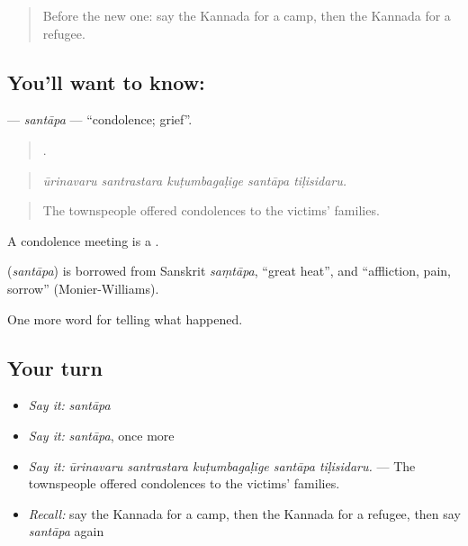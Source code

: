 \label{lesson:KA-C375-santapa}



\begin{quote}
Before the new one: say the Kannada for a camp, then the Kannada for a refugee.
\end{quote}

\subsection*{You'll want to know: }
\textbf{} — \emph{santāpa} — \textquotedblleft{}condolence; grief\textquotedblright{}.

\begin{quote}
    .
\end{quote}

\begin{quote}
\emph{ūrinavaru santrastara kuṭumbagaḷige santāpa tiḷisidaru.}
\end{quote}

\begin{quote}
The townspeople offered condolences to the victims' families.
\end{quote}

A condolence meeting is a  .

\begin{cousinweb}
\textbf{} (\emph{santāpa}) is borrowed from Sanskrit \emph{saṃtāpa}, \textquotedblleft{}great heat\textquotedblright{}, and \textquotedblleft{}affliction, pain, sorrow\textquotedblright{} (Monier-Williams).
\end{cousinweb}

\begin{grammarlens}[title={What you've built}]
One more word for telling what happened.
\end{grammarlens}

\subsection*{Your turn}
\begin{itemize}
\raggedright
  \item \emph{Say it:} \emph{santāpa}
  \item \emph{Say it:} \emph{santāpa}, once more
  \item \emph{Say it:} \emph{ūrinavaru santrastara kuṭumbagaḷige santāpa tiḷisidaru.} — The townspeople offered condolences to the victims' families.
  \item \emph{Recall:} say the Kannada for a camp, then the Kannada for a refugee, then say \emph{santāpa} again
\end{itemize}

